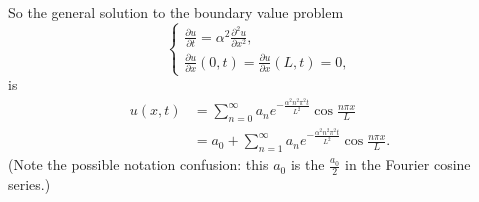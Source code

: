 \documentclass[a4paper]{article}
\theoremstyle{definition}
\numberwithin{equation}{section}
\begin{document}
\begin{enumerate}
\[\]
So the general solution to the boundary value problem 
\[
\begin{cases}
\frac{\partial u}{\partial t} =\alpha^2 \frac{\partial^2u}{\partial x^2},\\
\frac{\partial u}{\partial x}(0,t)=\frac{\partial u}{\partial x}(L,t)=0,
\end{cases}
\]
is
\begin{align*}
u(x,t)& =\sum_{n=0}^\infty a_ne^{-\frac{\alpha^2n^2\pi^2t}{L^2}} \cos \frac{n\pi x}{L}\\
& = a_0+\sum_{n=1}^\infty a_ne^{-\frac{\alpha^2n^2\pi^2t}{L^2}} \cos \frac{n\pi x}{L}.
\end{align*}
(Note the possible notation confusion: this $a_0$ is the $\frac{a_0}{2}$ in the Fourier cosine series.)

\end{enumerate}
\end{document}
